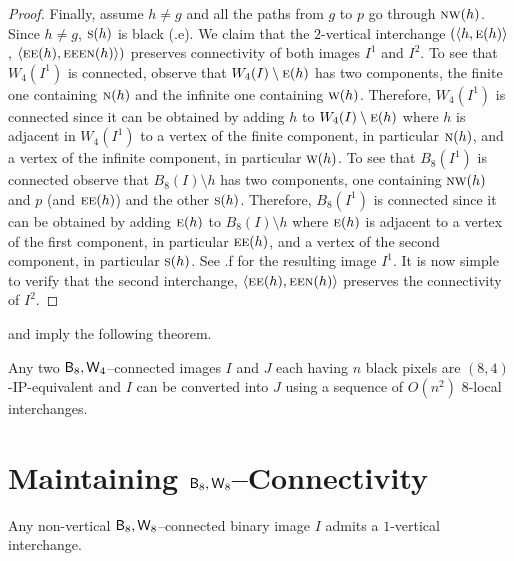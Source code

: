 \documentclass[lotsofwhite,charterfonts]{patmorin}
\newcommand{\eightfour}{\ensuremath{\protect\textup{\textsf{B}}_{8},\protect\textup{\textsf{W}}_{4}}}
\newcommand{\eighteight}{\ensuremath{\protect\textup{\textsf{B}}_{8},\protect\textup{\textsf{W}}_{8}}}
\newcommand{\N}{\textsc{n}}
\newcommand{\E}{\textsc{e}}
\renewcommand{\S}{\textsc{s}}
\newcommand{\W}{\textsc{w}}
\newcommand{\NW}{\textsc{nw}}
\newcommand{\ic}[2]{\langle #1,#2 \rangle}
\newcommand{\sm}{\ensuremath{\setminus}}
\begin{document}
\begin{proof}
Finally, assume $h\not=g$ and all the paths from $g$ to $p$ go through $\NW(h)$. Since $h\not=g$, $\S(h)$ is black (.e).  We claim that the $2$-vertical interchange $(\ic{h}{\E(h)}$, $\ic{\E\E(h)}{\E\E\E\N(h)})$ preserves connectivity of both images $I^1$ and $I^2$. To see that $W_4(I^1)$ is connected, observe that $W_4(I)\sm \E(h)$ has two components, the finite one containing $\N(h)$ and the infinite one containing $\W(h)$. Therefore, $W_4(I^1)$ is connected since it can be obtained by adding $h$ to $W_4(I)\sm \E(h)$ where $h$ is adjacent in $W_4(I^1)$ to a vertex of the finite component, in particular $\N(h)$, and a vertex of the infinite component, in particular $\W(h)$. To see that $B_8(I^1)$ is connected observe that $B_8(I)\sm h$ has two components, one containing $\NW(h)$ and $p$ (and $\E\E(h)$) and the other $\S(h)$. Therefore, $B_8(I^1)$ is connected since it can be obtained by adding $\E(h)$ to $B_8(I)\sm h$ where $\E(h)$ is adjacent to a vertex of the first component, in particular $\E\E(h)$, and a vertex of the second component, in particular $\S(h)$. See .f for the resulting image $I^1$. It is now simple to verify that the second interchange, $\ic{\E\E(h)}{\E\E\N(h)}$ preserves the connectivity of $I^2$.

\end{proof}

 and  imply the following theorem.


\begin{thm}
Any two \eightfour--connected images $I$ and $J$ each having $n$ black
pixels are $(8,4)$-IP-equivalent and $I$ can be converted into $J$ using a
sequence of $O(n^2)$ 8-local interchanges.
\end{thm}



\section{Maintaining \eighteight--Connectivity}



\begin{lem}
Any  non-vertical $\eighteight$--connected binary image $I$ admits a $1$-vertical interchange.\end{lem}
\end{document}
